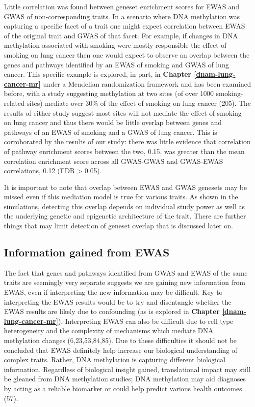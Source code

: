 \documentclass[11pt,oneside]{bristolthesis}
\begin{document}
Little correlation was found between geneset enrichment scores for EWAS and GWAS of non-corresponding traits. In a scenario where DNA methylation was capturing a specific facet of a trait one might expect correlation between EWAS of the original trait and GWAS of that facet. For example, if changes in DNA methylation associated with smoking were mostly responsible the effect of smoking on lung cancer then one would expect to observe an overlap between the genes and pathways identified by an EWAS of smoking and GWAS of lung cancer. This specific example is explored, in part, in \textbf{Chapter \ref{dnam-lung-cancer-mr}} under a Mendelian randomization framework and has been examined before, with a study suggesting methylation at two sites (of over 1000 smoking-related sites) mediate over 30\% of the effect of smoking on lung cancer (205). The results of either study suggest most sites will not mediate the effect of smoking on lung cancer and thus there would be little overlap between genes and pathways of an EWAS of smoking and a GWAS of lung cancer. This is corroborated by the results of our study: there was little evidence that correlation of pathway enrichment scores between the two, 0.15, was greater than the mean correlation enrichment score across all GWAS-GWAS and GWAS-EWAS correlations, 0.12 (FDR \textgreater{} 0.05).

It is important to note that overlap between EWAS and GWAS genesets may be missed even if this mediation model is true for various traits. As shown in the simulations, detecting this overlap depends on individual study power as well as the underlying genetic and epigenetic architecture of the trait. There are further things that may limit detection of geneset overlap that is discussed later on.

\hypertarget{information-gained}{%
\subsection{Information gained from EWAS}\label{information-gained}}

The fact that genes and pathways identified from GWAS and EWAS of the same traits are seemingly very separate suggests we are gaining new information from EWAS, even if interpreting the new information may be difficult. Key to interpreting the EWAS results would be to try and disentangle whether the EWAS results are likely due to confounding (as is explored in \textbf{Chapter \ref{dnam-lung-cancer-mr}}). Interpreting EWAS can also be difficult due to cell type heterogeneity and the complexity of mechanisms which mediate DNA methylation changes (6,23,53,84,85). Due to these difficulties it should not be concluded that EWAS definitely help increase our biological understanding of complex traits. Rather, DNA methylation is capturing different biological information. Regardless of biological insight gained, translational impact may still be gleaned from DNA methylation studies; DNA methylation may aid diagnoses by acting as a reliable biomarker or could help predict various health outcomes (57).
\end{document}
